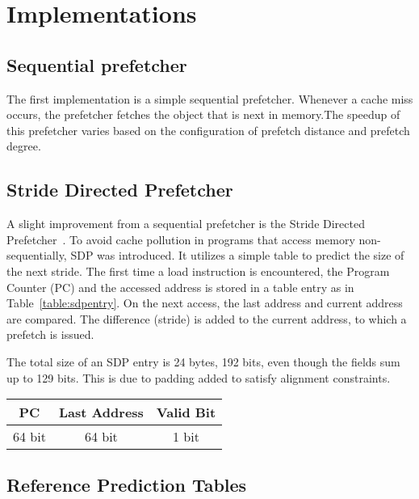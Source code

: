 \section{Implementations}


\subsection{Sequential prefetcher}
The first implementation is a simple sequential prefetcher.  Whenever
a cache miss occurs, the prefetcher fetches the object that is next in
memory.The speedup of this prefetcher varies based on the
configuration of prefetch distance and prefetch degree.

\subsection{Stride Directed Prefetcher}
A slight improvement from a sequential prefetcher is the Stride
Directed Prefetcher~\cite{sdp}.  To avoid cache pollution in programs
that access memory non-sequentially, SDP was introduced. It utilizes a
simple table to predict the size of the next stride. The first time a
load instruction is encountered, the Program Counter (PC) and the
accessed address is stored in a table entry as in
Table~\ref{table:sdpentry}. On the next access, the last address and
current address are compared. The difference (stride) is added to the
current address, to which a prefetch is issued.

The total size of an SDP entry is 24 bytes, 192 bits, even though the
fields sum up to 129 bits. This is due to padding added to satisfy
alignment constraints.

\begin{center}
  \begin{tabular}{ | c | c | c |}
    \hline
    PC & Last Address & Valid Bit \\ \hline
    64 bit & 64 bit & 1 bit \\ \hline
  \end{tabular}
  \label{table:sdpentry}
\end{center}


\subsection{Reference Prediction Tables}

